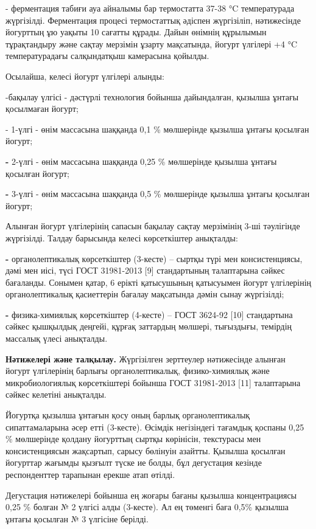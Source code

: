 - ферментация табиғи ауа айналымы бар термостатта 37-38 °C температурада
жүргізілді. Ферментация процесі термостаттық әдіспен жүргізіліп,
нәтижесінде йогурттың ұю уақыты 10 сағатты құрады. Дайын өнімнің
құрылымын тұрақтандыру және сақтау мерзімін ұзарту мақсатында, йогурт
үлгілері +4 °C температурадағы салқындатқыш камерасына қойылды.

Осылайша, келесі йогурт үлгілері алынды:

-бақылау үлгісі - дәстүрлі технология бойынша дайындалған, қызылша
ұнтағы қосылмаған йогурт;

- 1-үлгі - өнім массасына шаққанда 0,1 \% мөлшерінде қызылша ұнтағы
қосылған йогурт;

{\bfseries -} 2-үлгі - өнім массасына шаққанда 0,25 \% мөлшерінде қызылша
ұнтағы қосылған йогурт;

{\bfseries -} 3-үлгі - өнім массасына шаққанда 0,5 \% мөлшерінде қызылша
ұнтағы қосылған йогурт;

Алынған йогурт үлгілерінің сапасын бақылау сақтау мерзімінің 3-ші
тәулігінде жүргізілді. Талдау барысында келесі көрсеткіштер анықталды:

{\bfseries -} органолептикалық көрсеткіштер (3-кесте) -- сыртқы түрі мен
консистенциясы, дәмі мен иісі, түсі ГОСТ 31981-2013 {[}9{]} стандартының
талаптарына сәйкес бағаланды. Сонымен қатар, 6 ерікті қатысушының
қатысуымен йогурт үлгілерінің органолептикалық қасиеттерін бағалау
мақсатында дәмін сынау жүргізілді;

{\bfseries -} физика-химиялық көрсеткіштер (4-кесте) -- ГОСТ 3624-92
{[}10{]} стандартына сәйкес қышқылдық деңгейі, құрғақ заттардың мөлшері,
тығыздығы, темірдің массалық үлесі анықталды.

{\bfseries Нәтижелері және талқылау.} Жүргізілген зерттеулер нәтижесінде
алынған йогурт үлгілерінің барлығы органолептикалық, физико-химиялық
және микробиологиялық көрсеткіштері бойынша ГОСТ 31981-2013 {[}11{]}
талаптарына сәйкес келетіні анықталды.

Йогуртқа қызылша ұнтағын қосу оның барлық органолептикалық
сипаттамаларына әсер етті (3-кесте). Өсімдік негізіндегі тағамдық
қоспаны 0,25 \% мөлшерінде қолдану йогурттың сыртқы көрінісін,
текстурасы мен консистенциясын жақсартып, сарысу бөлінуін азайтты.
Қызылша қосылған йогурттар жағымды қызғылт түске ие болды, бұл
дегустация кезінде респонденттер тарапынан ерекше атап өтілді.

Дегустация нәтижелері бойынша ең жоғары бағаны қызылша концентрациясы
0,25 \% болған № 2 үлгісі алды (3-кесте). Ал ең төменгі баға 0,5\%
қызылша ұнтағы қосылған № 3 үлгісіне берілді.

